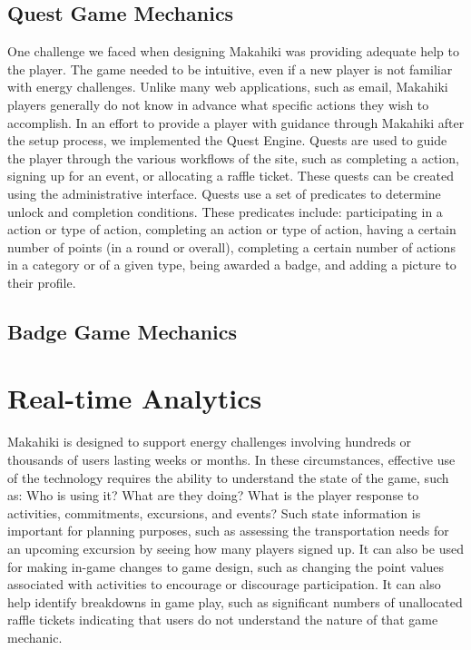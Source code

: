 \subsection{Quest Game Mechanics}

One challenge we faced when designing Makahiki was providing adequate help to the player. The game needed to be intuitive, even if a new player is not familiar with energy challenges. Unlike many web applications, such as email, Makahiki players generally do not know in advance what specific actions they wish to accomplish. In an effort to provide a player with guidance through Makahiki after the setup process, we implemented the Quest Engine. Quests are used to guide the player through the various workflows of the site, such as completing a action, signing up for an event, or allocating a raffle ticket. These quests can be created using the administrative interface. Quests use a set of predicates to determine unlock and completion conditions. These predicates include: participating in a action or type of action, completing an action or type of action, having a certain number of points (in a round or overall), completing a certain number of actions in a category or of a given type, being awarded a badge, and adding a picture to their profile.

\subsection{Badge Game Mechanics}


\section{Real-time Analytics}

Makahiki is designed to support energy challenges involving hundreds or thousands of users lasting weeks or months.  In these circumstances, effective use of the technology requires the ability to understand the state of the game, such as: Who is using it? What are they doing? What is the player response to activities, commitments, excursions, and events?   Such state information is important for planning purposes, such as assessing the transportation needs for an upcoming excursion by seeing how many players signed up.   It can also be used for making in-game changes to game design, such as changing the point values associated with activities to encourage or discourage participation.  It can also help identify breakdowns in game play, such as significant numbers of unallocated raffle tickets indicating that users do not understand the nature of that game mechanic.

